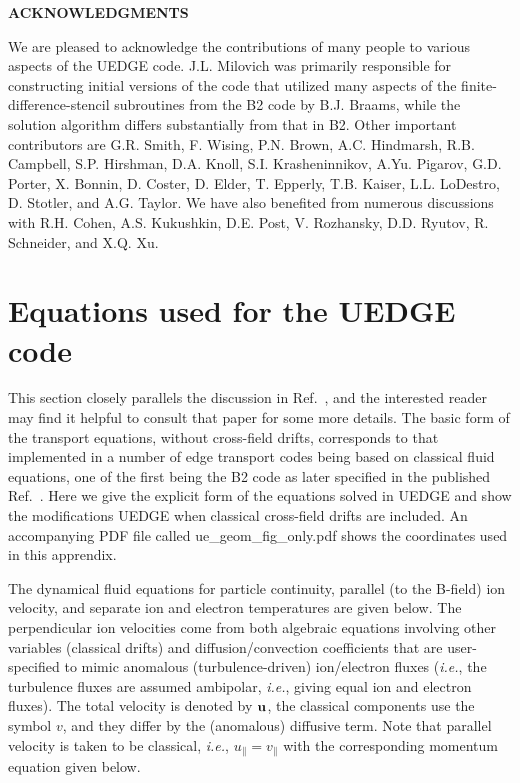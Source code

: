\documentclass [12pt]{article}
\begin{document}
\noindent
{\bf ACKNOWLEDGMENTS} 

We are pleased to acknowledge the contributions of many people to various
aspects of the {\sf UEDGE} code. J.L. Milovich was primarily responsible for
constructing initial versions of the code that utilized many aspects of the
finite-difference-stencil subroutines from the B2 code by B.J. Braams,
while the solution algorithm differs substantially from that in B2.  Other
important contributors are G.R. Smith, F. Wising, P.N. Brown, A.C. Hindmarsh,
R.B. Campbell, S.P. Hirshman, D.A. Knoll, S.I. Krasheninnikov, A.Yu. Pigarov,
G.D. Porter, X. Bonnin, D. Coster, D. Elder, T. Epperly, T.B. Kaiser,
L.L. LoDestro, D. Stotler, and A.G. Taylor.  We have also
benefited from numerous discussions with R.H. Cohen, A.S. Kukushkin,
D.E. Post, V. Rozhansky, D.D. Ryutov, R. Schneider, and X.Q. Xu.

\appendix
\section{Equations used for the {\sf UEDGE} code} 

This section closely parallels the discussion in Ref.~, and the
interested reader may find it helpful to consult that paper for some more
details.  The basic form of the transport equations, without cross-field
drifts, corresponds to that implemented in a number of edge transport codes
being based on classical fluid equations, one of the first being the B2
\cite{braams87} code as later specified in the published
Ref.~. Here we give the explicit form of the equations
solved in {\sf UEDGE} and show the modifications {\sf UEDGE} when classical 
cross-field drifts are included. An accompanying PDF file called 
{\sf ue\_geom\_fig\_only.pdf} shows the coordinates used in this apprendix.

The dynamical fluid equations for particle continuity, parallel (to the
B-field) ion velocity, and separate ion and electron temperatures are given
below.  The perpendicular ion velocities come from both algebraic equations
involving other variables (classical drifts) and diffusion/convection
coefficients that are user-specified to mimic anomalous (turbulence-driven)
ion/electron fluxes ({\it i.e.}, the turbulence fluxes are assumed ambipolar,
{\it i.e.}, giving equal ion and electron fluxes). The total velocity is
denoted by ${\bf u}$, the classical components use the symbol $v$, and they
differ by the (anomalous) diffusive term.  Note that parallel velocity is
taken to be classical, {\it i.e.}, $u_\| =v_\|$ with the corresponding
momentum equation given below.
\end{document}
